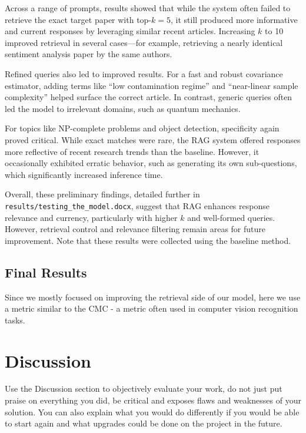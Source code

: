 \documentclass[fleqn,moreauthors,10pt]{ds_report}
\begin{document}
Across a range of prompts, results showed that while the system often failed to retrieve 
the exact target paper with top-$k=5$, it still produced more informative and current responses by leveraging similar recent articles. Increasing $k$ to 10 improved retrieval in several cases—for example, retrieving a nearly identical sentiment analysis paper by the same authors.

Refined queries also led to improved results. For a fast and robust covariance estimator, adding terms like “low contamination regime” and “near-linear sample complexity” helped surface the correct article. In contrast, generic queries often led the model to irrelevant domains, such as quantum mechanics.

For topics like NP-complete problems and object detection, specificity again proved critical. While exact matches were rare, the RAG system offered responses more reflective of recent research trends than the baseline. However, it occasionally exhibited erratic behavior, such as generating its own sub-questions, which significantly increased inference time.

Overall, these preliminary findings, detailed further in \texttt{results/testing\_the\_model.docx},
 suggest that RAG enhances response relevance and currency, particularly with higher $k$
  and well-formed queries. However, retrieval control and relevance filtering remain
  areas for future improvement. Note that these results were collected using the baseline method. 
  
\subsection*{Final Results}
Since we mostly focused on improving the retrieval side of our model, here we use a 
metric similar to the CMC - a metric often used in computer vision recognition tasks. 






\section*{Discussion}

Use the Discussion section to objectively evaluate your work, do not just put praise on everything you did, be critical and exposes flaws and weaknesses of your solution. You can also explain what you would do differently if you would be able to start again and what upgrades could be done on the project in the future.




\end{document}
